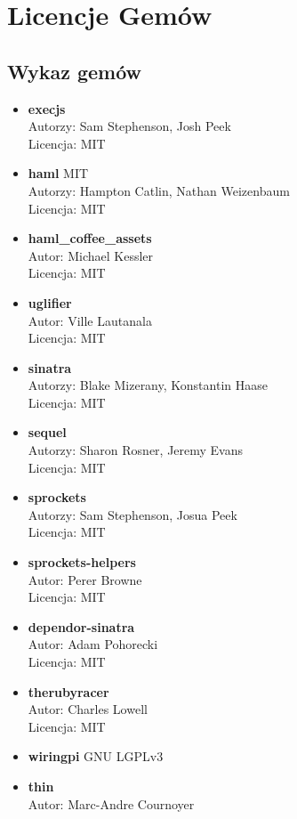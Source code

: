 \documentclass[11pt,a4paper, twoside]{article}
\begin{document}
\section{Licencje Gemów}
\subsection{Wykaz gemów}
\begin{itemize}
\item \textbf{execjs}  \\
Autorzy: Sam Stephenson, Josh Peek \\
Licencja: MIT
\item \textbf{haml} MIT \\
Autorzy: Hampton Catlin, Nathan Weizenbaum \\
Licencja: MIT
\item \textbf{haml\_coffee\_assets} \\
Autor: Michael Kessler \\
Licencja: MIT
\item \textbf{uglifier} \\
Autor: Ville Lautanala \\
Licencja: MIT
\item \textbf{sinatra} \\
Autorzy: Blake Mizerany, Konstantin Haase \\
Licencja: MIT 
\item \textbf{sequel} \\
Autorzy: Sharon Rosner, Jeremy Evans \\
Licencja: MIT
\item \textbf{sprockets} \\
Autorzy: Sam Stephenson, Josua Peek \\
Licencja: MIT
\item \textbf{sprockets-helpers} \\ 
Autor: Perer Browne \\
Licencja: MIT
\item \textbf{dependor-sinatra} \\ 
Autor: Adam Pohorecki \\
Licencja: MIT
\item \textbf{therubyracer} \\ 
Autor: Charles Lowell \\
Licencja: MIT
\item \textbf{wiringpi} GNU LGPLv3
\item \textbf{thin} \\ 
Autor: Marc-Andre Cournoyer \\

\end{itemize}
\end{document}
